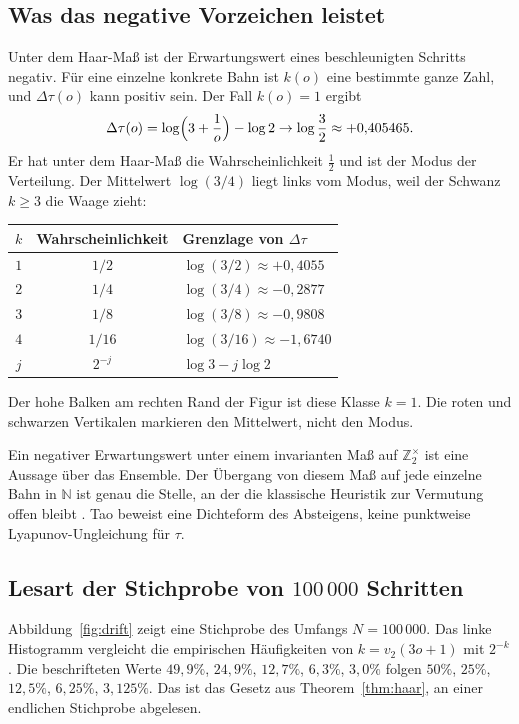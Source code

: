\documentclass[11pt,a4paper]{article}
\theoremstyle{plain}
\theoremstyle{definition}
\newcommand{\N}{\mathbb{N}}
\newcommand{\Z}{\mathbb{Z}}
\numberwithin{equation}{section}
\begin{document}
\subsection{Was das negative Vorzeichen leistet}

Unter dem Haar-Maß ist der Erwartungswert eines beschleunigten Schritts
negativ.
Für eine einzelne konkrete Bahn ist $k(o)$ eine bestimmte ganze Zahl, und
$\Delta\tau(o)$ kann positiv sein.
Der Fall $k(o)=1$ ergibt
\begin{equation}
\Delta\tau(o)=\log\Bigl(3+\frac1o\Bigr)-\log 2\to\log\frac32\approx +0{,}405465.
\end{equation}
Er hat unter dem Haar-Maß die Wahrscheinlichkeit $\tfrac12$ und ist der
Modus der Verteilung.
Der Mittelwert $\log(3/4)$ liegt links vom Modus, weil der Schwanz
$k\ge 3$ die Waage zieht:
\begin{center}
\begin{tabular}{@{}ccl@{}}
\toprule
$k$ & Wahrscheinlichkeit & Grenzlage von $\Delta\tau$\\
\midrule
$1$ & $1/2$ & $\log(3/2)\approx +0{,}4055$\\
$2$ & $1/4$ & $\log(3/4)\approx -0{,}2877$\\
$3$ & $1/8$ & $\log(3/8)\approx -0{,}9808$\\
$4$ & $1/16$ & $\log(3/16)\approx -1{,}6740$\\
$j$ & $2^{-j}$ & $\log 3-j\log 2$\\
\bottomrule
\end{tabular}
\end{center}
Der hohe Balken am rechten Rand der Figur ist diese Klasse $k=1$.
Die roten und schwarzen Vertikalen markieren den Mittelwert, nicht den Modus.

Ein negativer Erwartungswert unter einem invarianten Maß auf $\Z_2^\times$
ist eine Aussage über das Ensemble.
Der Übergang von diesem Maß auf jede einzelne Bahn in $\N$ ist genau die
Stelle, an der die klassische Heuristik zur Vermutung offen bleibt
\cite{Lagarias1985,Tao2019}.
Tao beweist eine Dichteform des Absteigens, keine punktweise Lyapunov-Ungleichung
für $\tau$.

\subsection{Lesart der Stichprobe von \texorpdfstring{$100\,000$}{100000} Schritten}

Abbildung~\ref{fig:drift} zeigt eine Stichprobe des Umfangs $N=100\,000$.
Das linke Histogramm vergleicht die empirischen Häufigkeiten von
$k=v_2(3o+1)$ mit $2^{-k}$.
Die beschrifteten Werte $49{,}9\%$, $24{,}9\%$, $12{,}7\%$, $6{,}3\%$, $3{,}0\%$
folgen $50\%$, $25\%$, $12{,}5\%$, $6{,}25\%$, $3{,}125\%$.
Das ist das Gesetz aus Theorem~\ref{thm:haar}, an einer endlichen Stichprobe
abgelesen.
\end{document}
